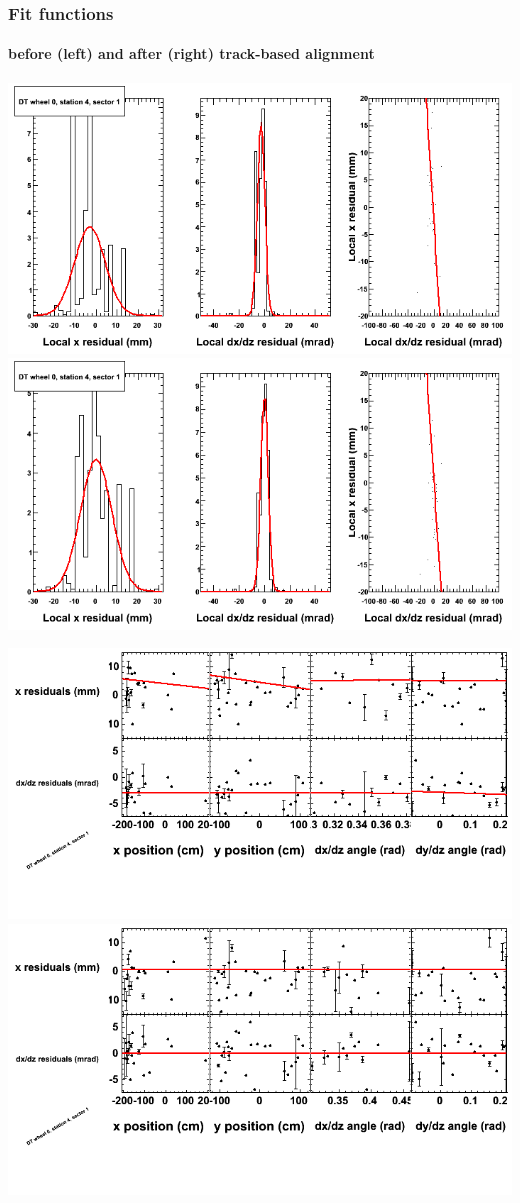 \documentclass[compress]{beamer}
\begin{document}
\begin{frame}
\frametitle{Fit functions}
\framesubtitle{before (left) and after (right) track-based alignment}
\includegraphics[width=0.5\linewidth]{fitfunctions_re01/MBwhCst4sec01_bellcurves.png} \includegraphics[width=0.5\linewidth]{fitfunctions_re05/MBwhCst4sec01_bellcurves.png}

\includegraphics[width=0.5\linewidth]{fitfunctions_re01/MBwhCst4sec01_polynomials.png} \includegraphics[width=0.5\linewidth]{fitfunctions_re05/MBwhCst4sec01_polynomials.png}
\end{frame}
\end{document}
